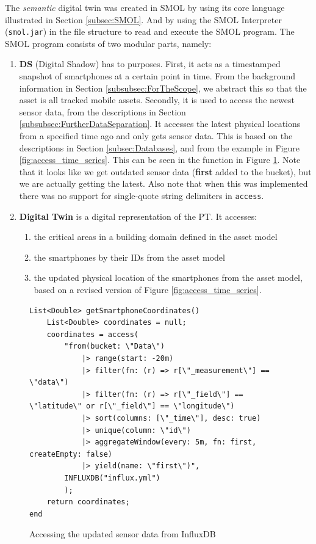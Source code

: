 \documentclass{article}
\begin{document}
The \emph{semantic} digital twin was created in SMOL by using its core language illustrated in Section \ref{subsec:SMOL}. And by using the SMOL Interpreter (\verb|smol.jar|) in the file structure to read and execute the SMOL program. The SMOL program consists of two modular parts, namely: 
\begin{enumerate}
    \item \textbf{DS} (Digital Shadow) has to purposes. First, it acts as a timestamped snapshot of smartphones at a certain point in time. From the background information in Section \ref{subsubsec:ForTheScope}, we abstract this so that the asset is all tracked mobile assets. Secondly, it is used to access the newest sensor data, from the descriptions in Section \ref{subsubsec:FurtherDataSeparation}. It accesses the latest physical locations from a specified time ago and only gets sensor data. This is based on the descriptions in Section \ref{subsec:Databases}, and from the example in Figure \ref{fig:access_time_series}. This can be seen in the function in Figure \ref{fig:DigitalShadowInflux}. Note that it looks like we get outdated sensor data (\textbf{first} added to the bucket), but we are actually getting the latest. Also note that when this was implemented there was no support for single-quote string delimiters in \verb|access|.
    \item \textbf{Digital Twin} is a digital representation of the PT. It accesses: 
    \begin{enumerate}
        \item the critical areas in a building domain defined in the asset model
        \item the smartphones by their IDs from the asset model
        \item the updated physical location of the smartphones from the asset model, based on a revised version of Figure \ref{fig:access_time_series}.
    \end{enumerate}
\end{enumerate}

\begin{figure}[H]
    \centering
    \begin{small}
    \begin{Verbatim}[frame=single,breaklines]
List<Double> getSmartphoneCoordinates()
    List<Double> coordinates = null;
    coordinates = access(
        "from(bucket: \"Data\")
            |> range(start: -20m)
            |> filter(fn: (r) => r[\"_measurement\"] == \"data\")
            |> filter(fn: (r) => r[\"_field\"] == \"latitude\" or r[\"_field\"] == \"longitude\")
            |> sort(columns: [\"_time\"], desc: true)
            |> unique(column: \"id\")
            |> aggregateWindow(every: 5m, fn: first, createEmpty: false)
            |> yield(name: \"first\")",
        INFLUXDB("influx.yml")
        );
    return coordinates;
end
    \end{Verbatim}
    \end{small}
    \caption{Accessing the updated sensor data from InfluxDB}
    \label{fig:DigitalShadowInflux}
\end{figure}
\end{document}
